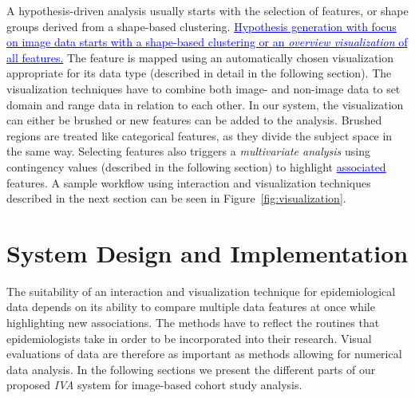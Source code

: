 \documentclass[journal]{style/vgtc} 			          %
\newcommand{\rem}[1]{\textcolor{red}{\sout{#1}}}
\newcommand{\add}[1]{\textcolor{blue}{\uline{#1}}}
\begin{document}
%
A hypothesis-driven analysis usually starts with the selection of features, or shape groups derived from a shape-based clustering.
%
\add{Hypothesis generation with focus on image data starts with a shape-based clustering or an \emph{overview visualization} of all features.}
%
The feature is mapped using an automatically chosen visualization appropriate for its data type (described in detail in the following section).
%
The visualization techniques have to combine both image- and non-image data to set domain and range data in relation to each other.
%
In our system, the visualization can either be brushed or new features can be added to the analysis. 
%
%
Brushed regions are treated like categorical features, as they divide the subject space in the same way.
%
Selecting features also triggers a \emph{multivariate analysis} using contingency values (described in the following section) to highlight \add{associated} features.  %
%
A sample workflow using interaction and visualization techniques described in the next section can be seen in Figure~\ref{fig:visualization}.

\section{System Design and Implementation} \label{Interaction- and Visualization Techniques}
%
The suitability of an interaction and visualization technique for epidemiological data depends on its ability to compare multiple data features at once while highlighting new associations.
%
The methods have to reflect the routines that epidemiologists take in order to be incorporated into their research.
%
Visual evaluations of data are therefore as important as methods allowing for numerical data analysis.
%
In the following sections we present the different parts of our proposed \emph{IVA} system for image-based cohort study analysis.
\end{document}
